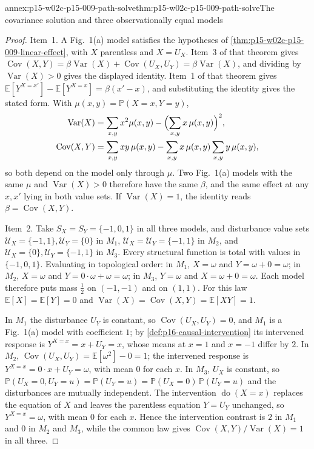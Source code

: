 \begin{annexitem}{annex:p15-w02c-p15-009-path-solve}{thm:p15-w02c-p15-009-path-solve}{The covariance solution and three observationally equal models}
\begin{proof}
Item~1. A Fig.~1(a) model satisfies the hypotheses of
\cref{thm:p15-w02c-p15-009-linear-effect}, with \(X\) parentless and
\(X=U_X\). Item~3 of that theorem gives
\(\operatorname{Cov}(X,Y)=\beta\operatorname{Var}(X)
+\operatorname{Cov}(U_X,U_Y)=\beta\operatorname{Var}(X)\), and dividing
by \(\operatorname{Var}(X)>0\) gives the displayed identity. Item~1 of
that theorem gives
\(\mathbb E[Y^{X=x'}]-\mathbb E[Y^{X=x}]=\beta(x'-x)\), and substituting
the identity gives the stated form. With \(\mu(x,y)=\mathbb P(X=x,Y=y)\),
\[
\begin{aligned}
 \operatorname{Var}(X)&=\sum_{x,y}x^2\mu(x,y)
     -\Bigl(\sum_{x,y}x\,\mu(x,y)\Bigr)^2,\\
 \operatorname{Cov}(X,Y)&=\sum_{x,y}xy\,\mu(x,y)
     -\sum_{x,y}x\,\mu(x,y)\sum_{x,y}y\,\mu(x,y),
\end{aligned}
\]
so both depend on the model only through \(\mu\). Two Fig.~1(a) models
with the same \(\mu\) and \(\operatorname{Var}(X)>0\) therefore have the
same \(\beta\), and the same effect at any \(x,x'\) lying in both value
sets. If \(\operatorname{Var}(X)=1\), the identity reads
\(\beta=\operatorname{Cov}(X,Y)\).

Item~2. Take \(S_X=S_Y=\{-1,0,1\}\) in all three models, and
disturbance value sets \(\mathcal U_X=\{-1,1\},\mathcal U_Y=\{0\}\) in
\(M_1\), \(\mathcal U_X=\mathcal U_Y=\{-1,1\}\) in \(M_2\), and
\(\mathcal U_X=\{0\},\mathcal U_Y=\{-1,1\}\) in \(M_3\). Every structural
function is total with values in \(\{-1,0,1\}\). Evaluating in
topological order: in \(M_1\), \(X=\omega\) and \(Y=\omega+0=\omega\);
in \(M_2\), \(X=\omega\) and \(Y=0\cdot\omega+\omega=\omega\); in
\(M_3\), \(Y=\omega\) and \(X=\omega+0=\omega\). Each model therefore
puts mass \(\tfrac12\) on \((-1,-1)\) and on \((1,1)\). For this law
\(\mathbb E[X]=\mathbb E[Y]=0\) and
\(\operatorname{Var}(X)=\operatorname{Cov}(X,Y)=\mathbb E[XY]=1\).

In \(M_1\) the disturbance \(U_Y\) is constant, so
\(\operatorname{Cov}(U_X,U_Y)=0\), and \(M_1\) is a Fig.~1(a) model with
coefficient \(1\); by \cref{def:p16-causal-intervention} its intervened
response is \(Y^{X=x}=x+U_Y=x\), whose means at \(x=1\) and \(x=-1\)
differ by \(2\). In \(M_2\),
\(\operatorname{Cov}(U_X,U_Y)=\mathbb E[\omega^2]-0=1\); the intervened
response is \(Y^{X=x}=0\cdot x+U_Y=\omega\), with mean \(0\) for each
\(x\). In \(M_3\), \(U_X\) is constant, so
\(\mathbb P(U_X=0,U_Y=u)=\mathbb P(U_Y=u)
=\mathbb P(U_X=0)\,\mathbb P(U_Y=u)\) and the disturbances are mutually
independent. The intervention \(\operatorname{do}(X=x)\) replaces the
equation of \(X\) and leaves the parentless equation \(Y=U_Y\)
unchanged, so \(Y^{X=x}=\omega\), with mean \(0\) for each \(x\). Hence
the intervention contrast is \(2\) in \(M_1\) and \(0\) in \(M_2\) and
\(M_3\), while the common law gives
\(\operatorname{Cov}(X,Y)/\operatorname{Var}(X)=1\) in all three.
\end{proof}
\end{annexitem}

